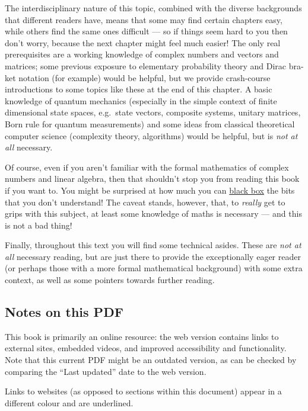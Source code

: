 \documentclass[fleqn,a4paper]{article}
\theoremstyle{definition}
\theoremstyle{definition}
\theoremstyle{definition}
\theoremstyle{definition}
\theoremstyle{remark}
\begin{document}
The interdisciplinary nature of this topic, combined with the diverse backgrounds that different readers have, means that some may find certain chapters easy, while others find the same ones difficult --- so if things seem hard to you then don't worry, because the next chapter might feel much easier!
The only real prerequisites are a working knowledge of complex numbers and vectors and matrices; some previous exposure to elementary probability theory and Dirac bra-ket notation (for example) would be helpful, but we provide crash-course introductions to some topics like these at the end of this chapter.
A basic knowledge of quantum mechanics (especially in the simple context of finite dimensional state spaces, e.g.~state vectors, composite systems, unitary matrices, Born rule for quantum measurements) and some ideas from classical theoretical computer science (complexity theory, algorithms) would be helpful, but is \emph{not at all} necessary.

Of course, even if you aren't familiar with the formal mathematics of complex numbers and linear algebra, then that shouldn't stop you from reading this book if you want to.
You might be surprised at how much you can \href{https://en.wikipedia.org/wiki/Black_box}{black box} the bits that you don't understand!
The caveat stands, however, that, to \emph{really} get to grips with this subject, at least some knowledge of maths is necessary --- and this is not a bad thing!

Finally, throughout this text you will find some technical asides.
These are \emph{not at all} necessary reading, but are just there to provide the exceptionally eager reader (or perhaps those with a more formal mathematical background) with some extra context, as well as some pointers towards further reading.

\hypertarget{notes-on-this-pdf}{%
\subsection*{Notes on this PDF}\label{notes-on-this-pdf}}

This book is primarily an online resource: the web version contains links to external sites, embedded videos, and improved accessibility and functionality.
Note that this current PDF might be an outdated version, as can be checked by comparing the ``Last updated'' date to the web version.

Links to websites (as opposed to sections within this document) appear in a different colour and are underlined.
\end{document}
